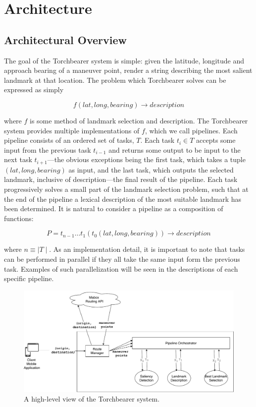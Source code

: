 \chapter{Architecture} \label{CH:architecture}

\section{Architectural Overview}\label{sec:arch:overview}
The goal of the Torchbearer system is simple: given the latitude, longitude and approach bearing of a maneuver point, render a string describing the most salient landmark at that location. The problem which Torchbearer solves can be expressed as simply

\begin{equation}\label{eq:problem}
    f(lat, long, bearing) \longrightarrow description
\end{equation}

where $f$ is some method of landmark selection and description. The Torchbearer system provides multiple implementations of $f$, which we call pipelines. Each pipeline consists of an ordered set of tasks, $T$. Each task $t_i \in T$ accepts some input from the previous task $t_{i-1}$ and returns some output to be input to the next task $t_{i+1}$---the obvious exceptions being the first task, which takes a tuple $(lat, long, bearing)$ as input, and the last task, which outputs the selected landmark, inclusive of description---the final result of the pipeline. Each task progressively solves a small part of the landmark selection problem, such that at the end of the pipeline a lexical description of the most suitable landmark has been determined. It is natural to consider a pipeline as a composition of functions:

\begin{equation}\label{eq:pipeline}
    P=t_{n-1} \dots t_1(t_0(lat, long, bearing)) \longrightarrow description
\end{equation}

where $n \equiv \mid T \mid$. As an implementation detail, it is important to note that tasks can be performed in parallel if they all take the same input form the previous task. Examples of such parallelization will be seen in the descriptions of each specific pipeline.



\begin{figure}[htbp]
  \centering
  \includegraphics[width=\textwidth]{images/Arch.pdf}
  \caption{A high-level view of the Torchbearer system.}
  \label{fig:pipeline:overview}
\end{figure}


